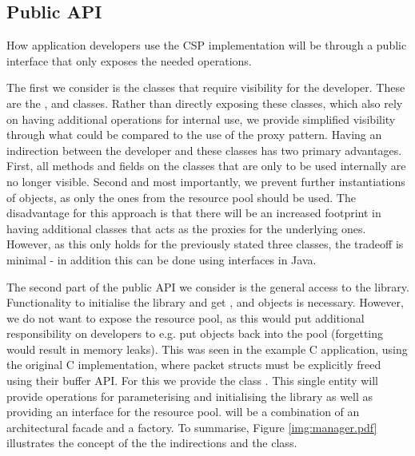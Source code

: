 \subsection{Public API}
How application developers use the CSP implementation will be through a public interface that only exposes the needed operations. 

The first we consider is the classes that require visibility for the developer. These are the ,  and  classes. Rather than directly exposing these classes, which also rely on having additional operations for internal use, we provide simplified visibility through what could be compared to the use of the proxy pattern\cite{Gamma:1995:DPE:186897}. Having an indirection between the developer and these classes has two primary advantages. First, all methods and fields on the classes that are only to be used internally are no longer visible. Second and most importantly, we prevent further instantiations of objects, as only the ones from the resource pool should be used. The disadvantage for this approach is that there will be an increased footprint in having additional classes that acts as the proxies for the underlying ones. However, as this only holds for the previously stated three classes, the tradeoff is minimal - in addition this can be done using interfaces in Java.

The second part of the public API we consider is the general access to the library. Functionality to initialise the library and get ,  and  objects is necessary. However, we do not want to expose the resource pool, as this would put additional responsibility on developers to e.g. put objects back into the pool (forgetting would result in memory leaks). This was seen in the example C application, using the original C implementation, where packet structs must be explicitly freed using their buffer API. For this we provide the class . This single entity will provide operations for parameterising and initialising the library as well as providing an interface for the resource pool.  will be a combination of an architectural facade and a factory\cite{Gamma:1995:DPE:186897}. To summarise, Figure \ref{img:manager.pdf} illustrates the concept of the the indirections and the  class.
